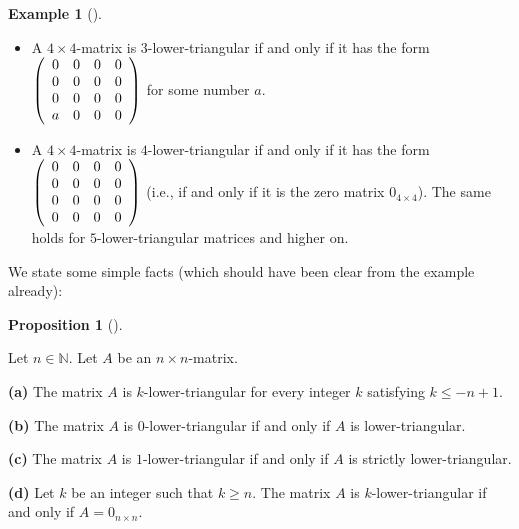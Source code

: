 \documentclass[numbers=enddot,12pt,final,onecolumn,notitlepage]{scrartcl}%
\theoremstyle{definition}
\newtheorem{prop}[theo]{Proposition}
\newenvironment{proposition}[1][]
{\begin{prop}[#1]\begin{leftbar}}
{\end{leftbar}\end{prop}}
\newtheorem{exam}[theo]{Example}
\newenvironment{example}[1][]
{\begin{exam}[#1]\begin{leftbar}}
{\end{leftbar}\end{exam}}
\begin{document}
\begin{example}
\begin{itemize}
\item A $4\times4$-matrix is $3$-lower-triangular if and only if it has the
form $\left(
\begin{array}
[c]{cccc}%
0 & 0 & 0 & 0\\
0 & 0 & 0 & 0\\
0 & 0 & 0 & 0\\
a & 0 & 0 & 0
\end{array}
\right)  $ for some number $a$.

\item A $4\times4$-matrix is $4$-lower-triangular if and only if it has the
form $\left(
\begin{array}
[c]{cccc}%
0 & 0 & 0 & 0\\
0 & 0 & 0 & 0\\
0 & 0 & 0 & 0\\
0 & 0 & 0 & 0
\end{array}
\right)  $ (i.e., if and only if it is the zero matrix $0_{4\times4}$). The
same holds for $5$-lower-triangular matrices and higher on.
\end{itemize}
\end{example}

We state some simple facts (which should have been clear from the example already):

\begin{proposition}
\label{prop.triangular.strict.k.values}Let $n\in\mathbb{N}$. Let $A$ be an
$n\times n$-matrix.

\textbf{(a)} The matrix $A$ is $k$-lower-triangular for every integer $k$
satisfying $k\leq-n+1$.

\textbf{(b)} The matrix $A$ is $0$-lower-triangular if and only if $A$ is lower-triangular.

\textbf{(c)} The matrix $A$ is $1$-lower-triangular if and only if $A$ is
strictly lower-triangular.

\textbf{(d)} Let $k$ be an integer such that $k\geq n$. The matrix $A$ is
$k$-lower-triangular if and only if $A=0_{n\times n}$.
\end{proposition}
\end{document}
